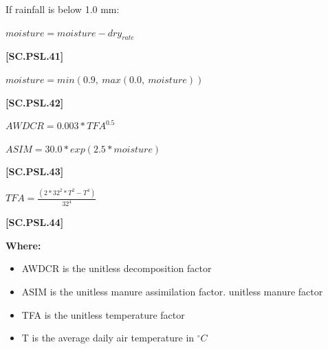 If rainfall is below 1.0 mm:
        \vspace{0.5cm}
        
    \begin{center}
\(moisture = moisture-dry_{rate}\)
    \end{center}
        \vspace{0.5cm} 
    
            {\raggedleft \textbf{[SC.PSL.41]}\par}
            \vspace{0.5cm}
        
    \begin{center}
\(moisture = min(0.9,\ max(0.0,\ moisture))\)
    \end{center}
        \vspace{0.5cm} 
    
            {\raggedleft \textbf{[SC.PSL.42]}\par}
            \vspace{0.5cm}
        
    \begin{center}
\(AWDCR = 0.003 * TFA^{0.5}\)
\vspace{0.1cm}

\(ASIM =30.0 * exp(2.5 * moisture)	\)
    \end{center}
        \vspace{0.5cm} 
    
            {\raggedleft \textbf{[SC.PSL.43]}\par}
            \vspace{0.5cm}
        
    \begin{center}
\(TFA =\frac{(2 * 32^2 * T^2-T^4)}{32^4}	\)
    \end{center}
        \vspace{0.5cm} 
    
            {\raggedleft \textbf{[SC.PSL.44]}\par}
            \vspace{0.5cm}

        \textbf{Where:}
            
        \begin{itemize}
            \item AWDCR is the unitless decomposition factor
            \item ASIM is the unitless manure assimilation factor. unitless manure factor 
            \item TFA is the unitless temperature factor
            \item T  is the average daily air temperature in \(^\circ C\)
        \end{itemize}
        \vspace{0.5cm}

